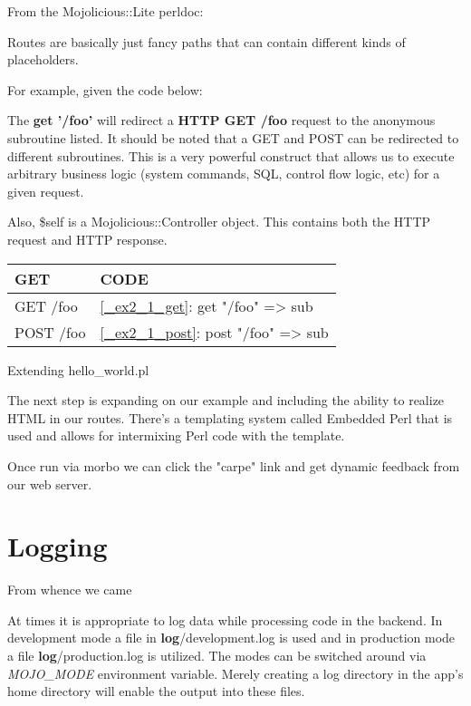 \documentclass[14pt]{extreport}
\newcommand\Small{\fontsize{12}{13.0}\fontencoding{T1}\selectfont}
\newcommand*\LSTfont{\Small\ttfamily\SetTracking{encoding=*}{-60}\lsstyle}
\begin{document}
From the Mojolicious::Lite perldoc:

Routes are basically just fancy paths that can contain different kinds of
placeholders.

For example, given the code below:



The \textbf{get '/foo'} will redirect a \textbf{HTTP GET /foo} request to the
anonymous subroutine listed. It should be noted that a GET and POST can be
redirected to different subroutines.  This is a very powerful construct that
allows us to execute arbitrary business logic (system commands, SQL, control
flow logic, etc) for a given request.

Also, \$self is a Mojolicious::Controller object.  This contains both the HTTP
request and HTTP response.

\begin{center}
  \begin{tabular}{|l|l|}
    \hline
    GET  & CODE\\
    \hline
    GET /foo & \ref{_ex2_1_get}: get "/foo" => sub {}\\
    POST /foo & \ref{_ex2_1_post}: post "/foo" => sub {}\\
    \hline
  \end{tabular}
\end{center}

{\Large Extending hello\_world.pl}

The next step is expanding on our example and including the ability to realize
HTML in our routes.  There's a templating system called Embedded Perl that is
used and allows for intermixing Perl code with the template.



Once run via morbo we can click the "carpe" link and get dynamic feedback from our web server.

\section{Logging}

{\Large From whence we came}

At times it is appropriate to log data while processing code in the backend.
In development mode a file in \textbf{log}/development.log is used and in
production mode a file \textbf{log}/production.log is utilized. The modes can
be switched around via \textit{MOJO\_MODE} environment variable. Merely
creating a log directory in the app's home directory will enable the output
into these files.
\end{document}
